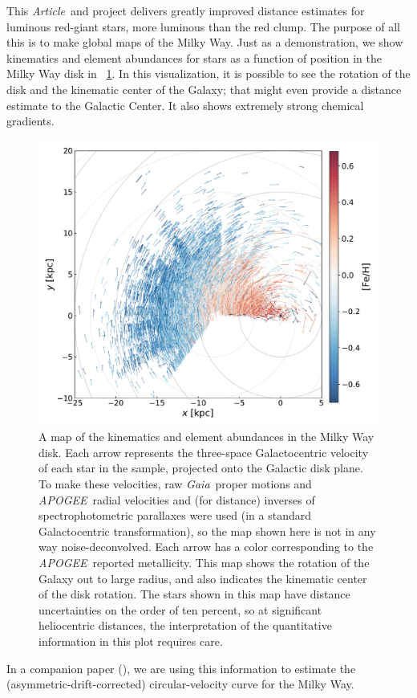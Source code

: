 \documentclass[modern]{aastex62}
\newcommand{\documentname}{\textsl{Article}}
\newcommand{\acronym}[1]{{\small{#1}}}
\newcommand{\project}[1]{\textsl{#1}}
\newcommand{\apogee}{\project{\acronym{APOGEE}}}
\newcommand{\gaia}{\project{Gaia}}
\begin{document}
This \documentname\ and project delivers greatly improved distance estimates for
luminous red-giant stars, more luminous than the red clump.
The purpose of all this is to make global maps of the Milky Way.
Just as a demonstration, we show kinematics and element abundances for stars as a function
of position in the Milky Way disk in \figurename~\ref{fig:disk}.
In this visualization, it is possible to see the rotation of the disk and the
kinematic center of the Galaxy; that might even provide a distance estimate to the Galactic
Center.
It also shows extremely strong chemical gradients.
\begin{figure}
\includegraphics[width=\textwidth]{map.pdf}
\caption{A map of the kinematics and element abundances in the Milky Way disk.
  Each arrow represents the three-space Galactocentric velocity of each star
  in the sample, projected onto the Galactic disk plane.
  To make these velocities, raw \gaia\ proper motions and \apogee\ radial velocities
  and (for distance) inverses of spectrophotometric parallaxes were used
  (in a standard Galactocentric transformation), so the map shown here is
  not in any way noise-deconvolved.
  Each arrow has a color corresponding to the \apogee\ reported metallicity.
  This map shows the rotation of the Galaxy out to large radius, and also
  indicates the kinematic center of the disk rotation. The stars shown in this
  map have distance uncertainties on the order of ten percent, so at significant
  heliocentric distances, the interpretation of
  the quantitative information in this plot requires care.\label{fig:disk}}
\end{figure}
In a companion paper (\citealt{eilers}), we are using this information to estimate
the (asymmetric-drift-corrected) circular-velocity curve for the Milky Way.
\end{document}
